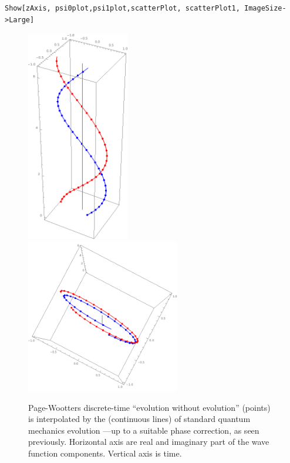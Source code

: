 \begin{Verbatim}
Show[zAxis, psi0plot,psi1plot,scatterPlot, scatterPlot1, ImageSize->Large]
\end{Verbatim}
\begin{figure}[!h]
  \centering
  \includegraphics[width=0.4\textwidth]{img/PWfit32.png}
  \includegraphics[width=0.6\textwidth]{img/PWfit32top.png}
  \caption[(from notebook)]{
    Page-Wootters discrete-time ``evolution without evolution'' (points)
    is interpolated by the (continuous lines) of standard quantum mechanics
    evolution ---up to a suitable phase correction, as seen previously.
    Horizontal axis are real and imaginary part of the wave function components.
    Vertical axis is time. 
  }
\end{figure}
